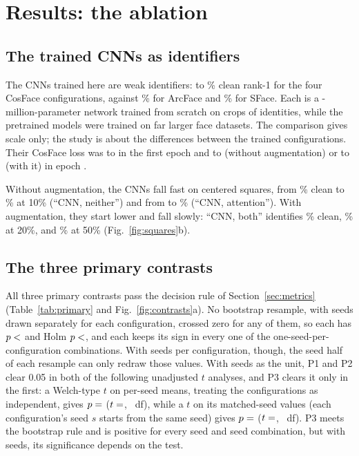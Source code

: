 \section{Results: the ablation}\label{sec:ablation}

\subsection{The trained CNNs as identifiers}

The CNNs trained here are weak identifiers:  to \% clean rank-1 for the four CosFace configurations, against \% for ArcFace and \% for SFace. Each is a -million-parameter network trained from scratch on  crops of  identities, while the pretrained models were trained on far larger face datasets. The comparison gives scale only; the study is about the differences between the trained configurations. Their CosFace loss was  to  in the first epoch and  to  (without augmentation) or  to  (with it) in epoch .

Without augmentation, the CNNs fall fast on centered squares, from \% clean to \% at 10\% (``CNN, neither'') and from  to \% (``CNN, attention''). With augmentation, they start lower and fall slowly: ``CNN, both'' identifies \% clean, \% at 20\%, and \% at 50\% (Fig.~\ref{fig:squares}b).

\subsection{The three primary contrasts}

All three primary contrasts pass the decision rule of Section~\ref{sec:metrics} (Table~\ref{tab:primary} and Fig.~\ref{fig:contrasts}a). No bootstrap resample, with seeds drawn separately for each configuration, crossed zero for any of them, so each has $p<\N{P1_p}$ and Holm $p<\N{P1_holm}$, and each keeps its sign in every one of the  one-seed-per-configuration combinations. With  seeds per configuration, though, the seed half of each resample can only redraw those  values. With seeds as the unit, P1 and P2 clear 0.05 in both of the following unadjusted $t$ analyses, and P3 clears it only in the first: a Welch-type $t$ on per-seed means, treating the configurations as independent, gives $p=\N{P3_seed_p}$ ($t=\N{P3_seed_t}$, ~df), while a $t$ on its  matched-seed values (each configuration's seed $s$ starts from the same seed) gives $p=\N{P3_pair_p}$ ($t=\N{P3_pair_t}$, ~df). P3 meets the bootstrap rule and is positive for every seed and seed combination, but with  seeds, its significance depends on the test.

